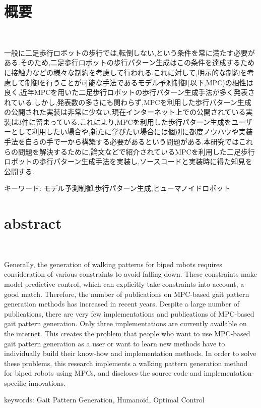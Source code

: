 \chapter*{概要}
\thispagestyle{empty}
%
\begin{center}
  \scalebox{1.5}{モデル予測制御による二足歩行ロボットの}\\
  \vspace{-0.3zh}
  \scalebox{1.5}{歩行パターン生成手法の実装と公開}
\end{center}
\vspace{1.0zh}
%
一般に二足歩行ロボットの歩行では,転倒しない,という条件を常に満たす必要がある.そのため,二足歩行ロボットの歩行パターン生成はこの条件を達成するために接触力などの様々な制約を考慮して行われる.これに対して,明示的な制約を考慮して制御を行うことが可能な手法であるモデル予測制御(以下,MPC)の相性は良く,近年MPCを用いた二足歩行ロボットの歩行パターン生成手法が多く発表されている.しかし,発表数の多さにも関わらず,MPCを利用した歩行パターン生成の公開された実装は非常に少ない.現在インターネット上での公開されている実装は3件に留まっている.これにより,MPCを利用した歩行パターン生成をユーザーとして利用したい場合や,新たに学びたい場合には個別に都度ノウハウや実装手法を自らの手で一から構築する必要があるという問題がある.本研究ではこれらの問題を解決するために,論文などで紹介されているMPCを利用した二足歩行ロボットの歩行パターン生成手法を実装し,ソースコードと実装時に得た知見を公開する.

キーワード: モデル予測制御,歩行パターン生成,ヒューマノイドロボット
%
\newpage
\chapter*{abstract}
\thispagestyle{empty}
%
\begin{center}
  \scalebox{1.3}{Implementation and publication of a walking pattern generation}\\
  \vspace{-0.3zh}
  \scalebox{1.5}{for biped robots using model predictive control}
\end{center}
\vspace{1.0zh}
%


Generally, the generation of walking patterns for biped robots requires consideration of various constraints to avoid falling down. These constraints make model predictive control, which can explicitly take constraints into account, a good match. Therefore, the number of publications on MPC-based gait pattern generation methods has increased in recent years. Despite a large number of publications, there are very few implementations and publications of MPC-based gait pattern generation. Only three implementations are currently available on the internet. This creates the problem that people who want to use MPC-based gait pattern generation as a user or want to learn new methods have to individually build their know-how and implementation methods. In order to solve these problems, this research implements a walking pattern generation method for biped robots using MPCs, and discloses the source code and implementation-specific innovations.

keywords: Gait Pattern Generation, Humanoid, Optimal Control
